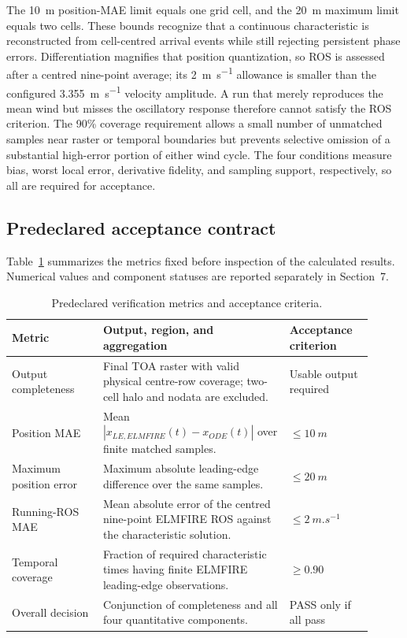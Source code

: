 The \SI{10}{m} position-MAE limit equals one grid cell, and the
\SI{20}{m} maximum limit equals two cells.  These bounds recognize that a
continuous characteristic is reconstructed from cell-centred arrival events
while still rejecting persistent phase errors.  Differentiation magnifies that
position quantization, so ROS is assessed after a centred nine-point average;
its \SI{2}{m.s^{-1}} allowance is smaller than the configured
\SI{3.355}{m.s^{-1}} velocity amplitude.  A run that merely reproduces the
mean wind but misses the oscillatory response therefore cannot satisfy the ROS
criterion.  The 90\% coverage requirement allows a small number of unmatched
samples near raster or temporal boundaries but prevents selective omission of
a substantial high-error portion of either wind cycle.  The four conditions
measure bias, worst local error, derivative fidelity, and sampling support,
respectively, so all are required for acceptance.

\subsection{Predeclared acceptance contract}

Table~\ref{tab:acceptance-contract} summarizes the metrics fixed before
inspection of the calculated results. Numerical values and component statuses
are reported separately in Section~7.

\begin{table}[H]
\centering
\footnotesize
\caption{Predeclared verification metrics and acceptance criteria.}
\label{tab:acceptance-contract}
\begin{tabular}{@{}p{0.23\linewidth}p{0.47\linewidth}p{0.21\linewidth}@{}}
\toprule
Metric & Output, region, and aggregation & Acceptance criterion\\
\midrule
Output completeness & Final TOA raster with valid physical centre-row coverage; two-cell halo and nodata are excluded. & Usable output required \\
Position MAE & Mean \(|x_{LE,ELMFIRE}(t)-x_{ODE}(t)|\) over finite matched samples. & \(\le\SI{10}{m}\) \\
Maximum position error & Maximum absolute leading-edge difference over the same samples. & \(\le\SI{20}{m}\) \\
Running-ROS MAE & Mean absolute error of the centred nine-point ELMFIRE ROS against the characteristic solution. & \(\le\SI{2}{m.s^{-1}}\) \\
Temporal coverage & Fraction of required characteristic times having finite ELMFIRE leading-edge observations. & \(\ge0.90\) \\
Overall decision & Conjunction of completeness and all four quantitative components. & PASS only if all pass \\
\bottomrule
\end{tabular}
\end{table}

